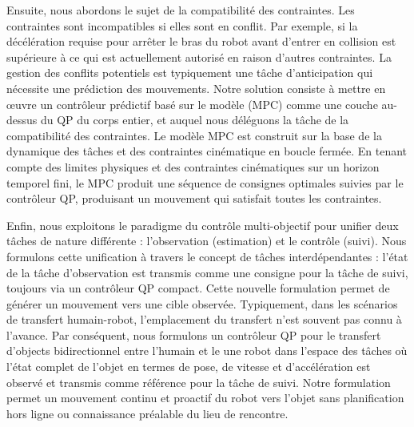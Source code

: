 Ensuite, nous abordons le sujet de la compatibilité des contraintes. Les contraintes sont incompatibles si elles sont en conflit. 
Par exemple, si la décélération requise pour arrêter le bras du robot avant d'entrer en collision est supérieure à ce qui est actuellement autorisé en raison d'autres contraintes. La gestion des conflits potentiels est typiquement une tâche d'anticipation qui nécessite une prédiction des mouvements. Notre solution consiste à mettre en œuvre un contrôleur prédictif basé sur le modèle (MPC) comme une couche au-dessus du QP du corps entier, et auquel nous déléguons la tâche de la compatibilité des contraintes. Le modèle MPC est construit sur la base de la dynamique des tâches et des contraintes cinématique en boucle fermée. En tenant compte des limites physiques et des contraintes cinématiques sur un horizon temporel fini, le MPC produit une séquence de consignes optimales suivies par le contrôleur QP, produisant un mouvement qui satisfait toutes les contraintes. 

Enfin, nous exploitons le paradigme du contrôle multi-objectif pour unifier deux tâches de nature différente : l'observation (estimation) et le contrôle (suivi). Nous formulons cette unification à travers le concept de tâches interdépendantes : l'état de la tâche d'observation est transmis comme une consigne pour la tâche de suivi, toujours via un contrôleur QP compact. Cette nouvelle formulation permet de générer un mouvement vers une cible observée. Typiquement, dans les scénarios de transfert humain-robot, l'emplacement du transfert n'est souvent pas connu à l'avance. Par conséquent, nous formulons un contrôleur QP pour le transfert d'objects bidirectionnel entre l'humain et le une robot dans l'espace des tâches où l'état complet de l'objet en termes de pose, de vitesse et d'accélération est observé et transmis comme référence pour la tâche de suivi. Notre formulation permet un mouvement continu et proactif du robot vers l'objet sans planification hors ligne ou connaissance préalable du lieu de rencontre.


